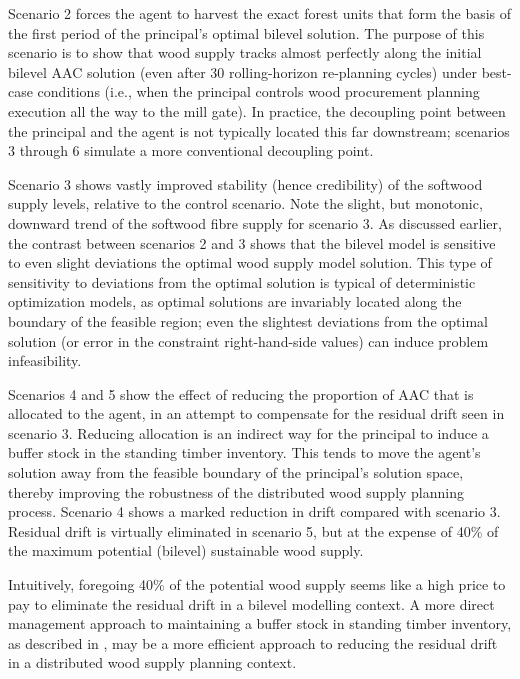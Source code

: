 Scenario 2 forces the agent to harvest the exact forest units that form the basis of the first period of the principal's optimal bilevel solution. The purpose of this scenario is to show that wood supply tracks almost perfectly along the initial bilevel AAC solution (even after 30 rolling-horizon re-planning cycles) under best-case conditions (i.e., when the principal controls wood procurement planning execution all the way to the mill gate). In practice, the decoupling point between the principal and the agent is not typically located this far downstream; scenarios 3 through 6 simulate a more conventional decoupling point.

Scenario 3 shows vastly improved stability (hence credibility) of the softwood supply levels, relative to the control scenario. Note the slight, but monotonic, downward trend of the softwood fibre supply for scenario 3. As discussed earlier, the contrast between scenarios 2 and 3 shows that the bilevel model is sensitive to even slight deviations the optimal wood supply model solution. This type of sensitivity to deviations from the optimal solution is typical of deterministic optimization models, as optimal solutions are invariably located along the boundary of the feasible region; even the slightest deviations from the optimal solution (or error in the constraint right-hand-side values) can induce problem infeasibility.

Scenarios 4 and 5 show the effect of reducing the proportion of AAC that is allocated to the agent, in an attempt to compensate for the residual drift seen in scenario 3. Reducing allocation is an indirect way for the principal to induce a buffer stock in the standing timber inventory. This tends to move the agent's solution away from the feasible boundary of the principal's solution space, thereby improving the robustness of the distributed wood supply planning process. Scenario 4 shows a marked reduction in drift compared with scenario 3. Residual drift is virtually eliminated in scenario 5, but at the expense of 40\% of the maximum potential (bilevel) sustainable wood supply. 

Intuitively, foregoing 40\% of the potential wood supply seems like a high price to pay to eliminate the residual drift in a bilevel modelling context. A more direct management approach to maintaining a buffer stock in standing timber inventory, as described in \citet{raulier2014increasing}, may be a more efficient approach to reducing the residual drift in a distributed wood supply planning context. 


